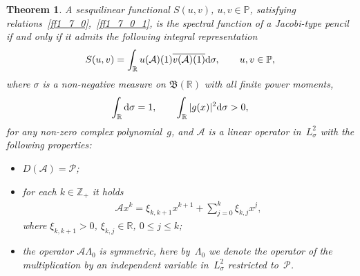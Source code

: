 \documentclass[11pt]{article}
\numberwithin{equation}{section}
\newtheorem{Theorem}{Theorem}[section]
\begin{document}
\begin{Theorem}\label{tt2_1}A sesquilinear functional $S(u,v)$, $u,v\in\mathbb{P}$, satisfying relations~\eqref{ff1_7_0},~\eqref{ff1_7_0_1}, is the spectral function of a Jacobi-type pencil if and only if it admits the following integral representation
\begin{gather}\label{ff2_5}
S(u,v) = \int_{\mathbb{R}} u(\mathcal{A})(1) \overline{ v(\mathcal{A})(1) } {\rm d}\sigma,\qquad u,v\in\mathbb{P},
\end{gather}
where $\sigma$ is a non-negative measure on $\mathfrak{B}(\mathbb{R})$ with all finite power moments,
\begin{gather*} \int_\mathbb{R} {\rm d}\sigma = 1, \qquad \int_\mathbb{R} |g(x)|^2 {\rm d}\sigma > 0,
\end{gather*} for any non-zero complex polynomial~$g$, and $\mathcal{A}$ is a linear operator in~$L^2_\sigma$ with the following properties:
\begin{itemize}\itemsep=0pt
\item[$(i)$] $D(\mathcal{A}) = \mathcal{P}$;
\item[$(ii)$] for each $k\in\mathbb{Z}_+$ it holds
\begin{gather}\label{ff2_7}
\mathcal{A} x^k = \xi_{k,k+1} x^{k+1} + \sum_{j=0}^k \xi_{k,j} x^j,
\end{gather}
where $\xi_{k,k+1} > 0$, $\xi_{k,j}\in\mathbb{R}$, $0\leq j\leq k$;
\item[$(iii)$] the operator $\mathcal{A} \Lambda_0$ is symmetric, here by~$\Lambda_0$ we denote the operator of the multiplication by an independent variable in~$L^2_\sigma$ restricted to~$\mathcal{P}$.
\end{itemize}
\end{Theorem}
\end{document}
